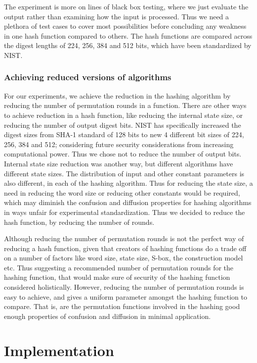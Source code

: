 The experiment is more on lines of black box testing, where we just evaluate the output rather than examining
how the input is processed. Thus we need a plethora of test cases to cover most possibilities before concluding
any weakness in one hash function compared to others. The hash functions are compared across the digest lengths
of 224, 256, 384 and 512 bits, which have been standardized by NIST.

\subsubsection{Achieving reduced versions of algorithms}
For our experiments, we achieve the reduction in the hashing algorithm by reducing the number of permutation
rounds in a function. There are other ways to achieve reduction in a hash function, like reducing the internal
state size, or reducing the number of output digest bits. NIST has specifically increased the digest sizes from
SHA-1 standard of 128 bits to new 4 different bit sizes of 224, 256, 384 and 512; considering future security
considerations from increasing computational power. Thus we chose not to reduce the number of output bits.
Internal state size reduction was another way, but different algorithms have different state sizes. The
distribution of input and other constant parameters is also different, in each of the hashing algorithm. Thus
for reducing the state size, a need in reducing the word size or reducing other constants would be required,
which may diminish the confusion and diffusion properties for hashing algorithms in ways unfair for experimental
standardization. Thus we decided to reduce the hash function, by reducing the number of rounds.

Although reducing the number of permutation rounds is not the perfect way of reducing a hash function, given 
that creators of hashing functions do a trade off on a number of factors like word size, state size, S-box,
the construction model etc. Thus suggesting a recommended number of permutation rounds for the hashing function,
that would make sure of security of the hashing function considered holistically. However, reducing the number
of permutation rounds is easy to achieve, and gives a uniform parameter amongst the hashing function to compare.
That is, are the permutation functions involved in the hashing good enough properties of confusion and
diffusion in minimal application.

\section{Implementation}

